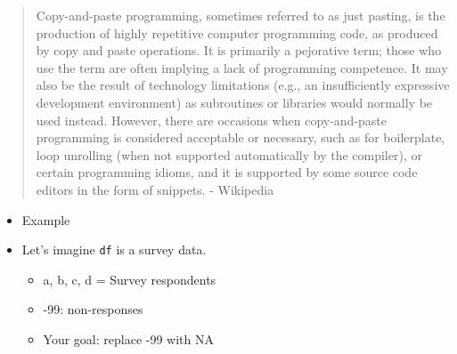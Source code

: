 \documentclass[
]{book}
\newenvironment{Shaded}{\begin{snugshade}}{\end{snugshade}}
\newcommand{\CommentTok}[1]{\textcolor[rgb]{0.56,0.35,0.01}{\textit{#1}}}
\newcommand{\DecValTok}[1]{\textcolor[rgb]{0.00,0.00,0.81}{#1}}
\newcommand{\KeywordTok}[1]{\textcolor[rgb]{0.13,0.29,0.53}{\textbf{#1}}}
\newcommand{\NormalTok}[1]{#1}
\newcommand{\OperatorTok}[1]{\textcolor[rgb]{0.81,0.36,0.00}{\textbf{#1}}}
\newcommand{\OtherTok}[1]{\textcolor[rgb]{0.56,0.35,0.01}{#1}}
\newcommand{\StringTok}[1]{\textcolor[rgb]{0.31,0.60,0.02}{#1}}
\begin{document}
\begin{quote}
Copy-and-paste programming, sometimes referred to as just pasting, is the production of highly repetitive computer programming code, as produced by copy and paste operations. It is primarily a pejorative term; those who use the term are often implying a lack of programming competence. It may also be the result of technology limitations (e.g., an insufficiently expressive development environment) as subroutines or libraries would normally be used instead. However, there are occasions when copy-and-paste programming is considered acceptable or necessary, such as for boilerplate, loop unrolling (when not supported automatically by the compiler), or certain programming idioms, and it is supported by some source code editors in the form of snippets. - Wikipedia
\end{quote}

\begin{itemize}
\item
  Example
\item
  Let's imagine \texttt{df} is a survey data.

  \begin{itemize}
  \item
    a, b, c, d = Survey respondents
  \item
    -99: non-responses
  \item
    Your goal: replace -99 with NA
  \end{itemize}
\end{itemize}

\begin{Shaded}
\end{Shaded}
\end{document}
